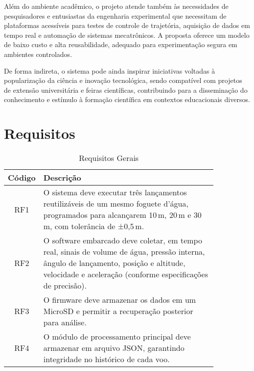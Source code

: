 Além do ambiente acadêmico, o projeto atende também às necessidades de pesquisadores e entusiastas da engenharia experimental que necessitam de plataformas acessíveis para testes de controle de trajetória, aquisição de dados em tempo real e automação de sistemas mecatrônicos. A proposta oferece um modelo de baixo custo e alta reusabilidade, adequado para experimentação segura em ambientes controlados.

De forma indireta, o sistema pode ainda inspirar iniciativas voltadas à popularização da ciência e inovação tecnológica, sendo compatível com projetos de extensão universitária e feiras científicas, contribuindo para a disseminação do conhecimento e estímulo à formação científica em contextos educacionais diversos.

\section{Requisitos}

\begin{table}[H]
\centering
\scriptsize
\setlength{\tabcolsep}{4pt}
\caption{Requisitos Gerais}
\begin{tabular}{|c|p{0.85\linewidth}|}
\hline
\textbf{Código} & \textbf{Descrição} \\
\hline
RF1 & O sistema deve executar três lançamentos reutilizáveis de um mesmo foguete d'água, programados para alcançarem 10\,m, 20\,m e 30\,m, com tolerância de ±0,5\,m. \\
\hline
RF2 & O software embarcado deve coletar, em tempo real, sinais de volume de água, pressão interna, ângulo de lançamento, posição e altitude, velocidade e aceleração (conforme especificações de precisão). \\
\hline
RF3 & O firmware deve armazenar os dados em um MicroSD e permitir a recuperação posterior para análise. \\
\hline
RF4 & O módulo de processamento principal deve armazenar em arquivo JSON, garantindo integridade no histórico de cada voo. \\
\hline
\end{tabular}
\label{tab:requisitos-funcionais}
\end{table}


